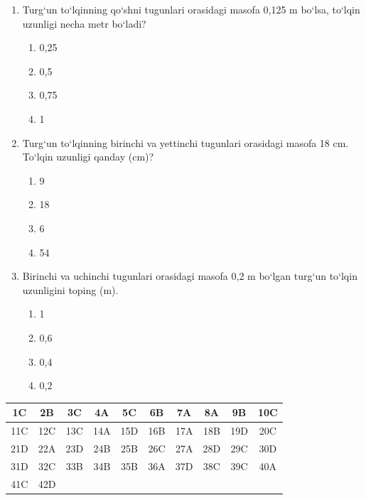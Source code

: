 \begin{enumerate}
\item Turg‘un to‘lqinning qo‘shni tugunlari orasidagi masofa 0,125 m bo‘lsa, to‘lqin uzunligi necha metr bo‘ladi?
\begin{enumerate}[label=\Alph*)]
\item 0,25
\item 0,5
\item 0,75
\item 1
\end{enumerate}

\item Turg‘un to‘lqinning birinchi va yettinchi tugunlari orasidagi masofa 18 cm. To‘lqin uzunligi qanday (cm)?
\begin{enumerate}[label=\Alph*)]
\item 9
\item 18
\item 6
\item 54
\end{enumerate}

\item Birinchi va uchinchi tugunlari orasidagi masofa 0,2 m bo‘lgan turg‘un to‘lqin uzunligini toping (m).
\begin{enumerate}[label=\Alph*)]
\item 1
\item 0,6
\item 0,4
\item 0,2
\end{enumerate}



\end{enumerate}





\begin{center}
\begin{tabular}{|c|c|c|c|c|c|c|c|c|c|}
\hline
1C & 2B & 3C & 4A & 5C & 6B & 7A & 8A & 9B & 10C \\
\hline
11C & 12C & 13C & 14A & 15D & 16B & 17A & 18B & 19D & 20C \\
\hline
21D & 22A & 23D & 24B & 25B & 26C & 27A & 28D & 29C & 30D \\
\hline
31D & 32C & 33B & 34B & 35B & 36A & 37D & 38C & 39C & 40A \\
\hline
41C & 42D & & & & & & & & \\
\hline
\end{tabular}
\end{center}